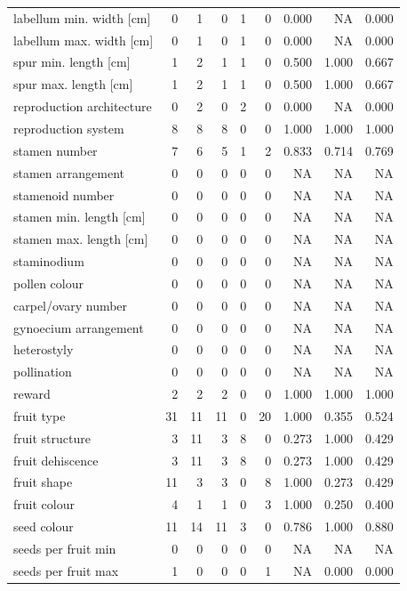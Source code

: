 \begin{longtable}{p{}rrrrrrrr}
labellum min. width [cm] & 0 & 1 & 0 & 1 & 0 & 0.000 & NA & 0.000 \\
labellum max. width [cm] & 0 & 1 & 0 & 1 & 0 & 0.000 & NA & 0.000 \\
spur min. length [cm] & 1 & 2 & 1 & 1 & 0 & 0.500 & 1.000 & 0.667 \\
spur max. length [cm] & 1 & 2 & 1 & 1 & 0 & 0.500 & 1.000 & 0.667 \\
reproduction architecture & 0 & 2 & 0 & 2 & 0 & 0.000 & NA & 0.000 \\
reproduction system & 8 & 8 & 8 & 0 & 0 & 1.000 & 1.000 & 1.000 \\
stamen number & 7 & 6 & 5 & 1 & 2 & 0.833 & 0.714 & 0.769 \\
stamen arrangement & 0 & 0 & 0 & 0 & 0 & NA & NA & NA \\
stamenoid number & 0 & 0 & 0 & 0 & 0 & NA & NA & NA \\
stamen min. length [cm] & 0 & 0 & 0 & 0 & 0 & NA & NA & NA \\
stamen max. length [cm] & 0 & 0 & 0 & 0 & 0 & NA & NA & NA \\
staminodium & 0 & 0 & 0 & 0 & 0 & NA & NA & NA \\
pollen colour & 0 & 0 & 0 & 0 & 0 & NA & NA & NA \\
carpel/ovary number & 0 & 0 & 0 & 0 & 0 & NA & NA & NA \\
gynoecium arrangement & 0 & 0 & 0 & 0 & 0 & NA & NA & NA \\
heterostyly & 0 & 0 & 0 & 0 & 0 & NA & NA & NA \\
pollination & 0 & 0 & 0 & 0 & 0 & NA & NA & NA \\
reward & 2 & 2 & 2 & 0 & 0 & 1.000 & 1.000 & 1.000 \\
fruit type & 31 & 11 & 11 & 0 & 20 & 1.000 & 0.355 & 0.524 \\
fruit structure & 3 & 11 & 3 & 8 & 0 & 0.273 & 1.000 & 0.429 \\
fruit dehiscence & 3 & 11 & 3 & 8 & 0 & 0.273 & 1.000 & 0.429 \\
fruit shape & 11 & 3 & 3 & 0 & 8 & 1.000 & 0.273 & 0.429 \\
fruit colour & 4 & 1 & 1 & 0 & 3 & 1.000 & 0.250 & 0.400 \\
seed colour & 11 & 14 & 11 & 3 & 0 & 0.786 & 1.000 & 0.880 \\
seeds per fruit min & 0 & 0 & 0 & 0 & 0 & NA & NA & NA \\
seeds per fruit max & 1 & 0 & 0 & 0 & 1 & NA & 0.000 & 0.000 \\

\end{longtable}
